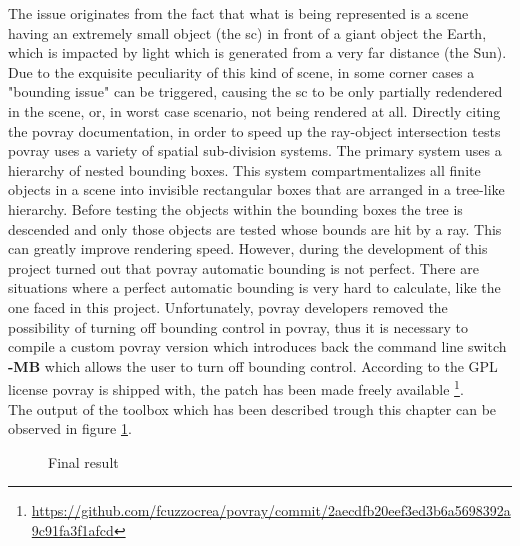 The issue originates from the fact that what is being represented is a scene having an extremely small object (the \acrshort{sc}) in front of a giant object {the Earth}, which is impacted by light which is generated from a very far distance (the Sun).
Due to the exquisite peculiarity of this kind of scene, in some corner cases a "bounding issue" can be triggered, causing the \acrshort{sc} to be only partially redendered in the scene, or, in worst case scenario, not being rendered at all.
Directly citing the \acrshort{povray} documentation, in order to speed up the ray-object intersection tests \acrshort{povray} uses a variety of spatial sub-division systems. The primary system uses a hierarchy of nested bounding boxes. This system compartmentalizes all finite objects in a scene into invisible rectangular boxes that are arranged in a tree-like hierarchy. Before testing the objects within the bounding boxes the tree is descended and only those objects are tested whose bounds are hit by a ray. This can greatly improve rendering speed.
However, during the development of this project turned out that \acrshort{povray} automatic bounding is not perfect. There are situations where a perfect automatic bounding is very hard to calculate, like the one faced in this project. Unfortunately, \acrshort{povray} developers removed the possibility of turning off bounding control in \acrshort{povray}, thus it is necessary to compile a custom \acrshort{povray} version which introduces back the command line switch \textbf{-MB} which allows the user to turn off bounding control. According to the GPL license \acrshort{povray} is shipped with, the patch has been made freely available \footnote{\url{https://github.com/fcuzzocrea/povray/commit/2aecdfb20eef3ed3b6a5698392a9c91fa3f1afcd}}.\\
The output of the toolbox which has been described trough this chapter can be observed in figure \ref{fig:finalResult}. 

\begin{figure}[htbp]
  \centering
  \qquad
  \qquad
  \qquad
  \qquad
  \qquad
  \caption{Final result}
  \label{fig:finalResult}
\end{figure}
